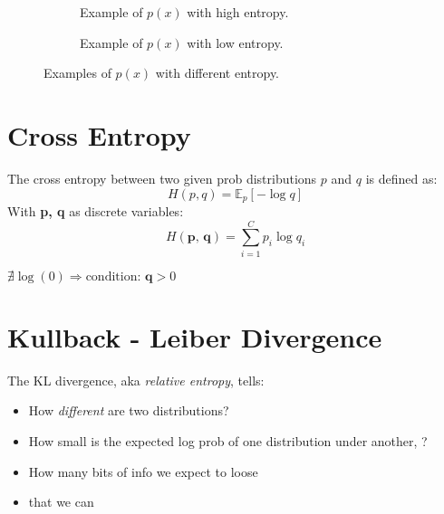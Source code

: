 \begin{figure}[hbt!]
	\centering
	\begin{subfigure}[b]{0.45\textwidth}
		\centering
		\caption{Example of $p(x)$ with high entropy.}
		\label{fig:entropy-high}
	\end{subfigure}
	\hfill
	\begin{subfigure}[b]{0.45\textwidth}
		\centering
		\caption{Example of $p(x)$ with low entropy.}
		\label{fig:entropy-low}
	\end{subfigure}
	\caption{Examples of $p(x)$ with different entropy.}
	\label{fig:entropy}
\end{figure}

\section{Cross Entropy}
\label{sec:cross-entropy}
The cross entropy between two given \ac{prob} distributions $p$ and $q$ is defined as:
\begin{equation}
	H(p, q) = \mathbb{E}_p[-\log q]
\end{equation}
With \textbf{p, q} as discrete variables:
\begin{equation}
	H(\textbf{p, q}) = \sum_{i=1}^{C} p_i \log q_i
\end{equation}

\note $\nexists \log (0) \Rightarrow \text{condition: } \textbf{q} >0$

\section{Kullback - Leiber Divergence}

The \ac{KL} divergence, \ac{aka} \textit{relative entropy}, tells:
\begin{itemize}
	\item How \textit{different} are two distributions?
	\item How small is the expected log \ac{prob} of one distribution under another, ?
	\item How many bits of info we expect to loose
	\item {} that we can 
\end{itemize}

